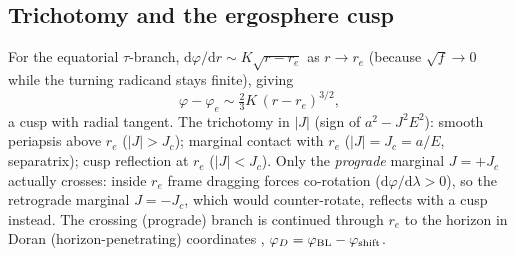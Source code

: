 \documentclass[12pt]{iopart}
\newcommand{\re}{r_{e}}
\newcommand{\Jc}{J_{c}}
\newcommand{\dd}{\mathrm{d}}
\begin{document}
\subsection{Trichotomy and the ergosphere cusp}
\label{sec:trichotomy}
For the equatorial $\tau$-branch, $\dd\varphi/\dd r\sim K\sqrt{r-\re}$ as
$r\to\re$ (because $\sqrt f\to0$ while the turning radicand stays finite),
giving
\begin{equation}
    \varphi-\varphi_e \sim \tfrac{2}{3}K\,(r-\re)^{3/2},
    \label{eq:cusp}
\end{equation}
a cusp with radial tangent. The trichotomy in $|J|$ (sign of $a^2-J^2E^2$):
smooth periapsis above $\re$ ($|J|>\Jc$); marginal contact with $\re$
($|J|=\Jc=a/E$, separatrix); cusp reflection at $\re$ ($|J|<\Jc$). Only the
\emph{prograde} marginal $J=+\Jc$ actually crosses: inside $\re$ frame dragging
forces co-rotation ($\dd\varphi/\dd\lambda>0$), so the retrograde marginal
$J=-\Jc$, which would counter-rotate, reflects with a cusp instead. The crossing
(prograde) branch is continued through $\re$ to the horizon in Doran
(horizon-penetrating) coordinates
\cite{Doran2000,Natario2009,MartelPoisson2001},
$\varphi_D=\varphi_{\rm BL}-\varphi_{\rm shift}$.
\end{document}
